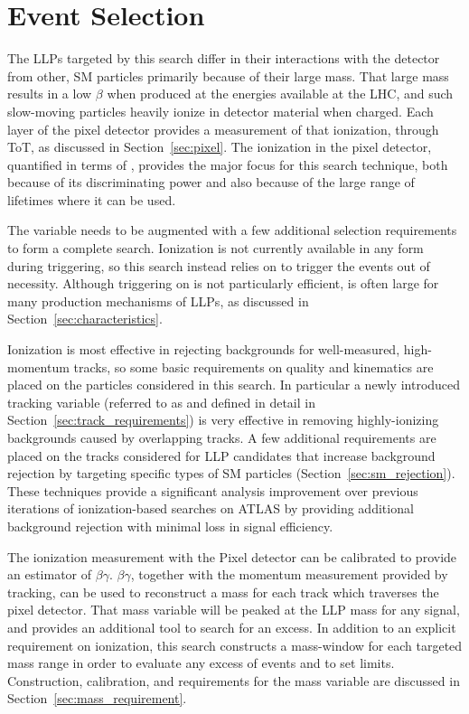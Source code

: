 \chapter{Event Selection}

\label{ch:selection}

The \ac{LLP}s targeted by this search differ in their interactions with the detector from other, \ac{SM} particles primarily because of their large mass. 
That large mass results in a low $\beta$ when produced at the energies available at the \ac{LHC}, and such slow-moving particles heavily ionize in detector material when charged. 
Each layer of the pixel detector provides a measurement of that ionization, through \ac{ToT}, as discussed in Section~\ref{sec:pixel}. 
The ionization in the pixel detector, quantified in terms of \dedx, provides the major focus for this search technique, both because of its discriminating power and also because of the large range of lifetimes where it can be used.

The \dedx variable needs to be augmented with a few additional selection requirements to form a complete search. 
Ionization is not currently available in any form during triggering, so this search instead relies on \met to trigger the events out of necessity. 
Although triggering on \met is not particularly efficient, \met is often large for many production mechanisms of \ac{LLP}s, as discussed in Section~\ref{sec:characteristics}.

Ionization is most effective in rejecting backgrounds for well-measured, high-momentum tracks, so some basic requirements on quality and kinematics are placed on the particles considered in this search. 
In particular a newly introduced tracking variable (referred to as \Nss and defined in detail in Section~\ref{sec:track_requirements}) is very effective in removing highly-ionizing backgrounds caused by overlapping tracks. 
A few additional requirements are placed on the tracks considered for \ac{LLP} candidates that increase background rejection by targeting specific types of \ac{SM} particles (Section~\ref{sec:sm_rejection}). 
These techniques provide a significant analysis improvement over previous iterations of ionization-based searches on ATLAS by providing additional background rejection with minimal loss in signal efficiency. 

The ionization measurement with the Pixel detector can be calibrated to provide an estimator of $\beta\gamma$. $\beta\gamma$, together with the momentum measurement provided by tracking, can be used to reconstruct a mass for each track which traverses the pixel detector. 
That mass variable will be peaked at the \ac{LLP} mass for any signal, and provides an additional tool to search for an excess.
In addition to an explicit requirement on ionization, this search constructs a mass-window for each targeted mass range in order to evaluate any excess of events and to set limits. 
Construction, calibration, and requirements for the mass variable are discussed in Section~\ref{sec:mass_requirement}.

